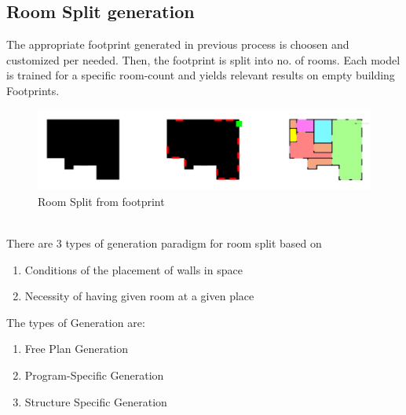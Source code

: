                 \subsection{Room Split generation}
                        The appropriate footprint generated in previous process is choosen and customized per needed. Then, the footprint is split into no. of rooms. Each model is trained for a specific room-count and yields relevant results on empty building Footprints.\pagebreak
                        \begin{figure}[h]
                                \centering
                                \includegraphics[width=1\textwidth]{img/chapter_6/room_split.png}
                                \caption{Room Split from footprint}
                                \label{fig: Room Split from footprint}
                        \end{figure}\\
                        \break 
                        There are 3 types of generation paradigm for room split based on 
                        \begin{enumerate}[label=\alph*.]
                                \item Conditions of the placement of walls in space
                                \item Necessity of having given room at a given place
                        \end{enumerate}
                        The types of Generation are: 
                        \begin{enumerate}[label=\alph*.]
                                \item Free Plan Generation 
                                \item Program-Specific Generation
                                \item Structure Specific Generation 
                        \end{enumerate}
